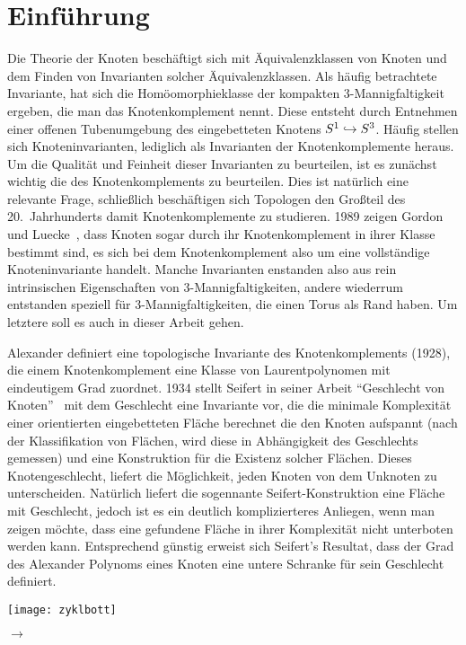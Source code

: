 \section{Einführung}
		
	\begin{minipage}[t][\textheight][t]{0.76\textwidth}

	Die Theorie der Knoten beschäftigt sich mit Äquivalenzklassen von Knoten und dem Finden von Invarianten solcher Äquivalenzklassen. Als häufig betrachtete Invariante, hat sich die Homöomorphieklasse der kompakten 3-Mannigfaltigkeit ergeben, die man das Knotenkomplement nennt. Diese entsteht durch Entnehmen einer offenen Tubenumgebung des eingebetteten Knotens $S^1 \hookrightarrow S^3$. Häufig stellen sich Knoteninvarianten, lediglich als Invarianten der Knotenkomplemente heraus. Um die Qualität und Feinheit dieser Invarianten zu beurteilen, ist es zunächst wichtig die des Knotenkomplements zu beurteilen. Dies ist natürlich eine relevante Frage, schließlich beschäftigen sich Topologen den Großteil des 20.~Jahrhunderts damit Knotenkomplemente zu studieren. 1989 zeigen Gordon und Luecke~\cite{Gordon.1989}, dass Knoten sogar durch ihr Knotenkomplement in ihrer Klasse bestimmt sind, es sich bei dem Knotenkomplement also um eine vollständige Knoteninvariante handelt. Manche Invarianten enstanden also aus rein intrinsischen Eigenschaften von 3-Mannigfaltigkeiten, andere wiederrum entstanden speziell für 3-Mannigfaltigkeiten, die einen Torus als Rand haben. Um letztere soll es auch in dieser Arbeit gehen.

	Alexander definiert eine topologische Invariante des Knotenkomplements \cite{Alexander.1928} (1928), die einem Knotenkomplement eine Klasse von Laurentpolynomen mit eindeutigem Grad zuordnet.  1934 stellt Seifert in seiner Arbeit "`Geschlecht von Knoten"'~\cite{Seifert.1934} mit dem Geschlecht eine Invariante vor, die die minimale Komplexität einer orientierten eingebetteten Fläche berechnet die den Knoten aufspannt (nach der Klassifikation von Flächen, wird diese in Abhängigkeit des Geschlechts gemessen) und eine Konstruktion für die Existenz solcher Flächen. Dieses Knotengeschlecht, liefert die Möglichkeit, jeden Knoten von dem Unknoten zu unterscheiden. Natürlich liefert die sogennante Seifert-Konstruktion eine Fläche mit Geschlecht, jedoch ist es ein deutlich komplizierteres Anliegen, wenn man zeigen möchte, dass eine gefundene Fläche in ihrer Komplexität nicht unterboten werden kann. Entsprechend günstig erweist sich Seifert's Resultat, dass der Grad des Alexander Polynoms eines Knoten eine untere Schranke für sein Geschlecht definiert.


	\vfill
	\begin{minipage}[t]{0.7\textwidth}
		\texttt{[image: zyklbott]} 
	\end{minipage}
	\begin{minipage}[t]{0.2\textwidth}
	\vspace{-1cm}
	\huge$\longrightarrow$
	\vfill
	\end{minipage}
	\vspace{1.5cm}
	\end{minipage}
